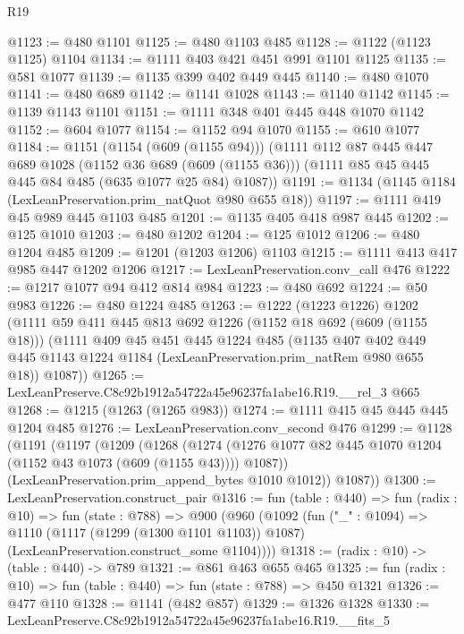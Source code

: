 \begin{lexlean}{R19}
\begin{coremodule}
@1123 := @480 @1101
@1125 := @480 @1103 @485
@1128 := @1122 (@1123 @1125) @1104
@1134 := @1111 @403 @421 @451 @991 @1101 @1125
@1135 := @581 @1077
@1139 := @1135 @399 @402 @449 @445
@1140 := @480 @1070
@1141 := @480 @689
@1142 := @1141 @1028
@1143 := @1140 @1142
@1145 := @1139 @1143 @1101
@1151 := @1111 @348 @401 @445 @448 @1070 @1142
@1152 := @604 @1077
@1154 := @1152 @94 @1070
@1155 := @610 @1077
@1184 := @1151
    (@1154 (@609 (@1155 @94)))
    (@1111
      @112
      @87
      @445
      @447
      @689
      @1028
      (@1152 @36 @689 (@609 (@1155 @36)))
      (@1111 @85 @45 @445 @445 @84 @485 (@635 @1077 @25 @84) @1087))
@1191 := @1134 (@1145 @1184 (LexLeanPreservation.prim_natQuot @980 @655 @18))
@1197 := @1111 @419 @45 @989 @445 @1103 @485
@1201 := @1135 @405 @418 @987 @445
@1202 := @125 @1010
@1203 := @480 @1202
@1204 := @125 @1012
@1206 := @480 @1204 @485
@1209 := @1201 (@1203 @1206) @1103
@1215 := @1111 @413 @417 @985 @447 @1202 @1206
@1217 := LexLeanPreservation.conv_call @476
@1222 := @1217 @1077 @94 @412 @814 @984
@1223 := @480 @692
@1224 := @50 @983
@1226 := @480 @1224 @485
@1263 := @1222
    (@1223 @1226)
    @1202
    (@1111
      @59
      @411
      @445
      @813
      @692
      @1226
      (@1152 @18 @692 (@609 (@1155 @18)))
      (@1111
        @409
        @45
        @451
        @445
        @1224
        @485
        (@1135
          @407
          @402
          @449
          @445
          @1143
          @1224
          @1184
          (LexLeanPreservation.prim_natRem @980 @655 @18))
        @1087))
@1265 := LexLeanPreserve.C8c92b1912a54722a45e96237fa1abe16.R19.__rel_3 @665
@1268 := @1215 (@1263 (@1265 @983))
@1274 := @1111 @415 @45 @445 @445 @1204 @485
@1276 := LexLeanPreservation.conv_second @476
@1299 := @1128
    (@1191
      (@1197
        (@1209
          (@1268
            (@1274 (@1276 @1077 @82 @445 @1070 @1204 (@1152 @43 @1073 (@609 (@1155 @43)))) @1087))
          (LexLeanPreservation.prim_append_bytes @1010 @1012))
        @1087))
@1300 := LexLeanPreservation.construct_pair
@1316 := fun (table : @440) =>
  fun (radix : @10) =>
  fun (state : @788) =>
  @900
    (@960
      (@1092
        (fun ("_" : @1094) =>
        @1110
          (@1117 (@1299 (@1300 @1101 @1103)) @1087)
          (LexLeanPreservation.construct_some @1104))))
@1318 := (radix : @10) -> (table : @440) -> @789
@1321 := @861 @463 @655 @465
@1325 := fun (radix : @10) => fun (table : @440) => fun (state : @788) => @450 @1321
@1326 := @477 @110
@1328 := @1141 (@482 @857)
@1329 := @1326 @1328
@1330 := LexLeanPreserve.C8c92b1912a54722a45e96237fa1abe16.R19.__fits_5

\end{coremodule}
\end{lexlean}
